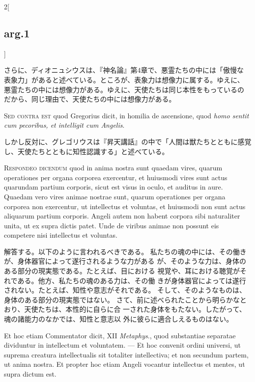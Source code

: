 \documentclass[paper=a4paper,fontsize=10pt,jafontsize=9pt,titlepage]{jlreq}
\begin{document}
\begin{paracol}{2}[\subsection{arg.1}]
\switchcolumn

さらに、ディオニュシウスは、『神名論』第4章で、悪霊たちの中には「傲慢な
 表象力」があると述べている。ところが、表象力は想像力に属する。ゆえに、
 悪霊たちの中には想像力がある。ゆえに、天使たちは同じ本性をもっているの
 だから、同じ理由で、天使たちの中には想像力がある。

\switchcolumn*[\subsection{s.c.}]

{\scshape Sed contra est} quod Gregorius dicit, in
homilia de ascensione, quod {\itshape homo sentit cum pecoribus, et intelligit cum
Angelis}.

\switchcolumn

しかし反対に、グレゴリウスは『昇天講話』の中で「人間は獣たちとともに感覚
 し、天使たちとともに知性認識する」と述べている。


{\scshape Respondeo dicendum} quod in anima nostra sunt
quaedam vires, quarum operationes per organa corporea exercentur, et
huiusmodi vires sunt actus quarundam partium corporis, sicut est visus
in oculo, et auditus in aure. Quaedam vero vires animae nostrae sunt,
quarum operationes per organa corporea non exercentur, ut intellectus et
voluntas, et huiusmodi non sunt actus aliquarum partium corporis. Angeli
autem non habent corpora sibi naturaliter unita, ut ex supra dictis
patet. Unde de viribus animae non possunt eis competere nisi intellectus
et voluntas.

\switchcolumn

解答する。以下のように言われるべきである。
私たちの魂の中には、その働きが、身体器官によって遂行されるような力がある
 が、そのような力は、身体のある部分の現実態である。たとえば、目における
 視覚や、耳における聴覚がそれである。他方、私たちの魂のある力は、その働
 きが身体器官によっては遂行されない。たとえば、知性や意志がそれである。
そして、そのようなものは、身体のある部分の現実態ではない。
さて、前に述べられたことから明らかなとおり、天使たちは、本性的に自らに合
 一された身体をもたない。したがって、魂の諸能力のなかでは、知性と意志以
 外に彼らに適合しえるものはない。

\switchcolumn*

Et hoc etiam Commentator dicit, XII {\itshape Metaphys}., quod
substantiae separatae dividuntur in intellectum et voluntatem. --- Et hoc
convenit ordini universi, ut suprema creatura intellectualis sit
totaliter intellectiva; et non secundum partem, ut anima nostra. Et
propter hoc etiam Angeli vocantur intellectus et mentes, ut supra dictum
est.


\end{paracol}
\end{document}
